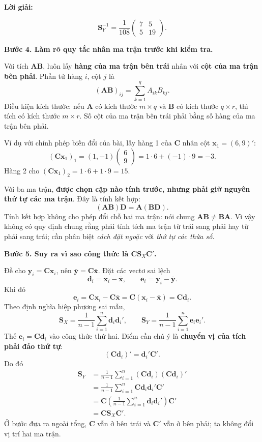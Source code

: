 \documentclass[11pt,a4paper]{article}
\newenvironment{solution}{%
  \par\medskip\noindent\textbf{Lời giải:}\par\nobreak\smallskip\noindent\ignorespaces
}{\par}
\newcommand{\step}[2]{\par\medskip\noindent\textbf{Bước #1. #2}\par\nopagebreak[4]\smallskip\noindent}
\begin{document}
\begin{solution}
\begin{enumerate}[label=\textbf{\alph*)}]
\[\mathbf{S}_Y^{-1}=\frac1{108}\begin{pmatrix}7&5\\5&19\end{pmatrix}.
\]
\step{4}{Làm rõ quy tắc nhân ma trận trước khi kiểm tra.}
Với tích $\mathbf{A}\mathbf{B}$, luôn lấy \textbf{hàng của ma trận bên trái}
nhân với \textbf{cột của ma trận bên phải}. Phần tử hàng $i$, cột $j$ là
\[
(\mathbf{A}\mathbf{B})_{ij}=\sum_{k=1}^q A_{ik}B_{kj}.
\]
Điều kiện kích thước: nếu $\mathbf{A}$ có kích thước $m\times q$ và
$\mathbf{B}$ có kích thước $q\times r$, thì tích có kích thước $m\times r$.
Số cột của ma trận bên trái phải bằng số hàng của ma trận bên phải.

Ví dụ với chính phép biến đổi của bài, lấy hàng 1 của $\mathbf{C}$
nhân cột $\mathbf{x}_1=(6,9)'$:
\[
(\mathbf{C}\mathbf{x}_1)_1=(1,-1)\begin{pmatrix}6\\9\end{pmatrix}
=1\cdot6+(-1)\cdot9=-3.
\]
Hàng 2 cho $(\mathbf{C}\mathbf{x}_1)_2=1\cdot6+1\cdot9=15$.

Với ba ma trận, \textbf{được chọn cặp nào tính trước, nhưng phải giữ nguyên
thứ tự các ma trận}. Đây là tính kết hợp:
\[
\boxed{(\mathbf{A}\mathbf{B})\mathbf{D}
=\mathbf{A}(\mathbf{B}\mathbf{D}).}
\]
Tính kết hợp không cho phép đổi chỗ hai ma trận:
nói chung $\mathbf{A}\mathbf{B}\ne\mathbf{B}\mathbf{A}$.
Vì vậy không có quy định chung rằng phải tính tích ma trận từ trái sang phải
hay từ phải sang trái; cần phân biệt \emph{cách đặt ngoặc} với
\emph{thứ tự các thừa số}.

\step{5}{Suy ra vì sao công thức là $\mathbf{C}\mathbf{S}_X\mathbf{C}'$.}
Đề cho $\mathbf{y}_i=\mathbf{C}\mathbf{x}_i$, nên
$\bar{\mathbf{y}}=\mathbf{C}\bar{\mathbf{x}}$.
Đặt các vectơ sai lệch
\[
\mathbf{d}_i=\mathbf{x}_i-\bar{\mathbf{x}},\qquad
\mathbf{e}_i=\mathbf{y}_i-\bar{\mathbf{y}}.
\]
Khi đó
\[
\mathbf{e}_i=\mathbf{C}\mathbf{x}_i-\mathbf{C}\bar{\mathbf{x}}
=\mathbf{C}(\mathbf{x}_i-\bar{\mathbf{x}})=\mathbf{C}\mathbf{d}_i.
\]
Theo định nghĩa hiệp phương sai mẫu,
\[
\mathbf{S}_X=\frac1{n-1}\sum_{i=1}^n\mathbf{d}_i\mathbf{d}_i',\qquad
\mathbf{S}_Y=\frac1{n-1}\sum_{i=1}^n\mathbf{e}_i\mathbf{e}_i'.
\]
Thế $\mathbf{e}_i=\mathbf{C}\mathbf{d}_i$ vào công thức thứ hai.
Điểm cần chú ý là \textbf{chuyển vị của tích phải đảo thứ tự}:
\[
(\mathbf{C}\mathbf{d}_i)'=\mathbf{d}_i'\mathbf{C}'.
\]
Do đó
\begin{align*}
\mathbf{S}_Y
&=\frac1{n-1}\sum_{i=1}^n
 (\mathbf{C}\mathbf{d}_i)(\mathbf{C}\mathbf{d}_i)'\\
&=\frac1{n-1}\sum_{i=1}^n
 \mathbf{C}\mathbf{d}_i\mathbf{d}_i'\mathbf{C}'\\
&=\mathbf{C}\left(\frac1{n-1}\sum_{i=1}^n
 \mathbf{d}_i\mathbf{d}_i'\right)\mathbf{C}'\\
&=\boxed{\mathbf{C}\mathbf{S}_X\mathbf{C}'}.
\end{align*}
Ở bước đưa ra ngoài tổng, $\mathbf{C}$ vẫn ở bên trái và $\mathbf{C}'$
vẫn ở bên phải; ta không đổi vị trí hai ma trận.


\end{enumerate}
\end{solution}
\end{document}
